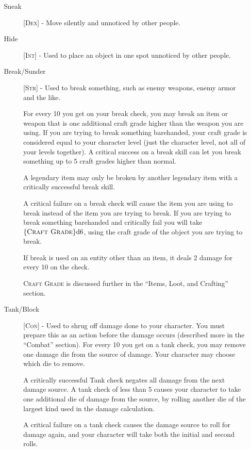 \begin{description}
\item[Sneak] [\textsc{Dex}] - Move silently and unnoticed by other people.

\item[Hide] [\textsc{Int}] - Used to place an object in one spot unnoticed by other people. 

\item[Break/Sunder] [\textsc{Str}] - Used to break something, such as enemy weapons, enemy armor and the like.

For every 10 you get on your break check, you may break an item or weapon that is one additional craft grade higher than the weapon you are using. If you are trying to break something barehanded, your craft grade is considered equal to your character level (just the character level, not all of your levels together). A critical success on a break skill can let you break something up to 5 craft grades higher than normal.

A legendary item may only be broken by another legendary item with a critically successful break skill.

A critical failure on a break check will cause the item you are using to break instead of the item you are trying to break. If you are trying to break something barehanded and critically fail you will take $\{ \textsc{Craft Grade} \}\mathrm{d}6$, using the craft grade of the object you are trying to break.

If break is used on an entity other than an item, it deals 2 damage for every 10 on the check.

\textsc{Craft Grade} is discussed further in the ``Items, Loot, and Crafting'' section.

\item[Tank/Block] [\textsc{Con}] - Used to shrug off damage done to your character. You must prepare this as an action before the damage occurs (described more in the ``Combat'' section).
For every 10 you get on a tank check, you may remove one damage die from the source of damage. Your character may choose which die to remove.

A critically successful Tank check negates all damage from the next damage source. A tank check of less than 5 causes your character to take one additional die of damage from the source, by rolling another die of the largest kind used in the damage calculation.

A critical failure on a tank check causes the damage source to roll for damage again, and your character will take both the initial and second rolls.


\end{description}
